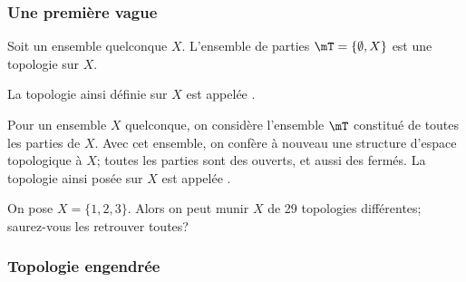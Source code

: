 \subsubsection{Une première vague}

\begin{example}\label{DefTopologieGrossiere}
	Soit un ensemble quelconque \( X\). L'ensemble de parties \( \mT=\{ \emptyset, X \}\) est une topologie sur \( X\).

	La topologie ainsi définie sur \(X \) est appelée .
\end{example}

\begin{example}\label{DefTopologieDiscrete}
	Pour un ensemble \( X \) quelconque, on considère l'ensemble \( \mT \) constitué de toutes les parties de \( X \). Avec cet ensemble, on confère à nouveau une structure d'espace topologique à \(X \); toutes les parties sont des ouverts, et aussi des fermés. La topologie ainsi posée sur \(X \) est appelée .
\end{example}

\begin{example}       \label{EXooLAOSooJtjJnu}
	On pose \( X = \{1, 2, 3\} \). Alors on peut munir \( X \) de 29 topologies différentes\cite{BIBooSLBZooRYtdIi}; saurez-vous les retrouver toutes?
\end{example}

\subsubsection{Topologie engendrée}

